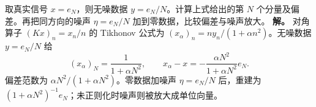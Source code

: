 \par
\begin{workedexample}
取真实信号 \(x=e_N\)，则无噪数据 \(y=e_N/N\)。计算上式给出的第 \(N\) 个分量及偏差。再把同方向的噪声 \(\eta=e_N/N\) 加到零数据，比较偏差与噪声放大。
\textbf{解。} 对角算子 \((Kx)_n=x_n/n\) 的 Tikhonov 公式为 \((x_\alpha)_n=ny_n/(1+\alpha n^2)\)。无噪数据 \(y=e_N/N\) 给
\[
(x_\alpha)_N=\frac1{1+\alpha N^2},\qquad x_\alpha-x=-\frac{\alpha N^2}{1+\alpha N^2}e_N.
\]
偏差范数为 \(\alpha N^2/(1+\alpha N^2)\)。零数据加噪声 \(\eta=e_N/N\) 后，重建为 \((1+\alpha N^2)^{-1}e_N\)；未正则化时噪声则被放大成单位向量。
\end{workedexample}
\par
